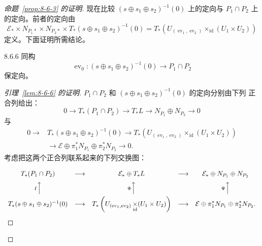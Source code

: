 \begin{proof}[命题~\ref{prop:8-6-3} 的证明]
现在比较 $(s\oplus s_1\oplus s_2)^{-1}(0)$ 上的定向与
$P_1\cap P_2$ 上的定向。前者的定向由
\[
 \mathcal E_*\times N_{P_1*}\times N_{P_2*}
 \times T_*(s\oplus s_1\oplus s_2)^{-1}(0)
 =T_*\left(
 U_{(\operatorname{ev}_1,\operatorname{ev}_2)}
 \mathop{\times}_{\mathrm{id}}(U_1\times U_2)\right)
\]
定义。下面证明所需结论。

\begin{lemma}{8.6.6}\label{lem:8-6-6}
同构
\[
 \operatorname{ev}_0\colon(s\oplus s_1\oplus s_2)^{-1}(0)
 \longrightarrow P_1\cap P_2
\]
保定向。
\end{lemma}

\begin{proof}[引理~\ref{lem:8-6-6} 的证明]
$P_1\cap P_2$ 和 $(s\oplus s_1\oplus s_2)^{-1}(0)$ 的定向分别由下列
正合列给出：
\[
 0\longrightarrow T_*(P_1\cap P_2)\longrightarrow T_*L
 \longrightarrow N_{P_1}\oplus N_{P_2}\longrightarrow0
\]
与
\[
\begin{aligned}
 0\longrightarrow{}&T_*(s\oplus s_1\oplus s_2)^{-1}(0)
 \longrightarrow
 T_*\left(U_{(\operatorname{ev}_1,\operatorname{ev}_2)}
 \mathop{\times}_{\mathrm{id}}(U_1\times U_2)\right)\\
 &\longrightarrow
 \mathcal E\oplus\pi_1^*N_{P_1}\oplus\pi_2^*N_{P_2}
 \longrightarrow0.
\end{aligned}
\]
考虑把这两个正合列联系起来的下列交换图：

\begingroup
\footnotesize
\[
\begin{array}{ccccc}
T_*(P_1\cap P_2)&\longrightarrow
&\mathcal E_*\oplus T_*L&\longrightarrow
&\mathcal E_*\oplus N_{P_1}\oplus N_{P_2}\\[0.6em]
{\scriptstyle I}\Big\uparrow&&{\scriptstyle\Phi}\Big\uparrow
&&{\scriptstyle\Psi}\Big\uparrow\\[0.6em]
T_*(s\oplus s_1\oplus s_2)^{-1}(0)&\longrightarrow
&\begin{gathered}
T_*\left(U_{(\operatorname{ev}_1,\operatorname{ev}_2)}
\mathop{\times}_{\mathrm{id}}(U_1\times U_2)\right)
\end{gathered}&\longrightarrow
&\begin{gathered}
\mathcal E\oplus\pi_1^*N_{P_1}\oplus\pi_2^*N_{P_2}
\end{gathered}.
\end{array}
\]
\endgroup


\end{proof}
\end{proof}
